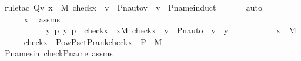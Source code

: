 \begin{isabellebody}
\ {\isacharparenleft}{\kern0pt}rule{\isacharunderscore}{\kern0pt}tac\ Q{\isacharequal}{\kern0pt}{\isachardoublequoteopen}{\isasymlambda}v{\isachardot}{\kern0pt}\ {\isasymforall}x\ {\isasymin}\ M{\isachardot}{\kern0pt}\ {\isacharparenleft}{\kern0pt}check{\isacharparenleft}{\kern0pt}x{\isacharparenright}{\kern0pt}\ {\isacharequal}{\kern0pt}\ v\ {\isasymlongrightarrow}\ Pn{\isacharunderscore}{\kern0pt}auto{\isacharparenleft}{\kern0pt}{\isasympi}{\isacharparenright}{\kern0pt}{\isacharbackquote}{\kern0pt}{\isacharparenleft}{\kern0pt}v{\isacharparenright}{\kern0pt}\ {\isacharequal}{\kern0pt}\ v{\isacharparenright}{\kern0pt}{\isachardoublequoteclose}\ \ P{\isacharunderscore}{\kern0pt}name{\isacharunderscore}{\kern0pt}induct{\isacharparenright}{\kern0pt}\ \isanewline
\ \ \ \ \isamarkupfalse%
\ {\isacharparenleft}{\kern0pt}auto{\isacharparenright}{\kern0pt}\isanewline
\ \ \isamarkupfalse%
\ {\isacharminus}{\kern0pt}\isanewline
\ \ \ \ \isamarkupfalse%
\ x\ \isamarkupfalse%
\ assms\ {\isacharcolon}{\kern0pt}\ \isanewline
\ \ \ \ \ \ \ \ \ \ \ {\isachardoublequoteopen}{\isasymforall}y{\isachardot}{\kern0pt}\ {\isacharparenleft}{\kern0pt}{\isasymexists}p{\isachardot}{\kern0pt}\ {\isasymlangle}y{\isacharcomma}{\kern0pt}\ p{\isasymrangle}\ {\isasymin}\ check{\isacharparenleft}{\kern0pt}x{\isacharparenright}{\kern0pt}{\isacharparenright}{\kern0pt}\ {\isasymlongrightarrow}\ {\isacharparenleft}{\kern0pt}{\isasymexists}x{\isasymin}M{\isachardot}{\kern0pt}\ check{\isacharparenleft}{\kern0pt}x{\isacharparenright}{\kern0pt}\ {\isacharequal}{\kern0pt}\ y{\isacharparenright}{\kern0pt}\ {\isasymlongrightarrow}\ Pn{\isacharunderscore}{\kern0pt}auto{\isacharparenleft}{\kern0pt}{\isasympi}{\isacharparenright}{\kern0pt}\ {\isacharbackquote}{\kern0pt}\ y\ {\isacharequal}{\kern0pt}\ y{\isachardoublequoteclose}\isanewline
\ \ \ \ \ \ \ \ \ \ \ {\isachardoublequoteopen}x\ {\isasymin}\ M{\isachardoublequoteclose}\isanewline
\ \ \ \ \isamarkupfalse%
\ {\isachardoublequoteopen}check{\isacharparenleft}{\kern0pt}x{\isacharparenright}{\kern0pt}\ {\isasymin}\ Pow{\isacharparenleft}{\kern0pt}P{\isacharunderscore}{\kern0pt}set{\isacharparenleft}{\kern0pt}P{\isacharunderscore}{\kern0pt}rank{\isacharparenleft}{\kern0pt}check{\isacharparenleft}{\kern0pt}x{\isacharparenright}{\kern0pt}{\isacharparenright}{\kern0pt}{\isacharparenright}{\kern0pt}\ {\isasymtimes}\ P{\isacharparenright}{\kern0pt}\ {\isasyminter}\ M{\isachardoublequoteclose}\ \isanewline
\ \ \ \ \ \ \isamarkupfalse%
\ P{\isacharunderscore}{\kern0pt}names{\isacharunderscore}{\kern0pt}in\ check{\isacharunderscore}{\kern0pt}P{\isacharunderscore}{\kern0pt}name\ assms\ \isamarkupfalse%

\end{isabellebody}

